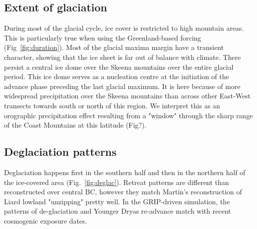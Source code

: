 \documentclass[tc, ms]{copernicus}
\begin{document}
\subsection{Extent of glaciation}

During most of the glacial cycle, ice cover is restricted to high mountain
areas. This is particularly true when using the Greenland-based forcing
(Fig~\ref{fig:duration}). Most of the glacial maxima margin have a transient
character, showing that the ice sheet is far out of balance with climate. There
persist a central ice dome over the Skeena mountains over the entire glacial
period. This ice dome serves as a nucleation centre at the initiation of the
advance phase preceding the last glacial maximum. It is here because of more
widespread precipitation over the Skeena mountains than across other East-West
transects towards south or north of this region. We interpret this as an
orographic precipitation effect resulting from a "window" through the sharp
range of the Coast Mountains at this latitude (Fig?).

\subsection{Deglaciation patterns}

Deglaciation happens first in the southern half and then in the northern half
of the ice-covered area (Fig.~\ref{fig:deglac}). Retreat patterns are different
than reconstructed over central BC, however they match Martin's reconstruction
of Liard lowland "unzipping" pretty well. In the GRIP-driven simulation, the
patterns of de-glaciation and Younger Dryas re-advance match with recent
cosmogenic exposure dates.

\conclusions
\label{sec:concl}


%
\newpage

\end{document}
